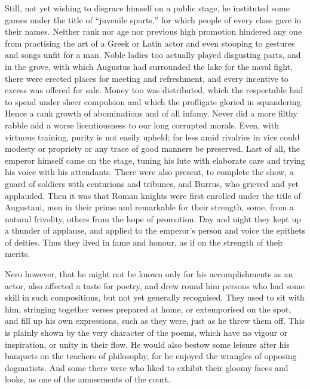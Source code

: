 Still, not yet wishing to disgrace himself on a public stage, he instituted some games under the title of ``juvenile sports,'' for which people of every class gave in their names. Neither rank nor age nor previous high promotion hindered any one from practising the art of a Greek or Latin actor and even stooping to gestures and songs unfit for a man. Noble ladies too actually played disgusting parts, and in the grove, with which Augustus had surrounded the lake for the naval fight, there were erected places for meeting and refreshment, and every incentive to excess was offered for sale. Money too was distributed, which the respectable had to spend under sheer compulsion and which the profligate gloried in squandering. Hence a rank growth of abominations and of all infamy. Never did a more filthy rabble add a worse licentiousness to our long corrupted morals. Even, with virtuous training, purity is not easily upheld; far less amid rivalries in vice could modesty or propriety or any trace of good manners be preserved. Last of all, the emperor himself came on the stage, tuning his lute with elaborate care and trying his voice with his attendants. There were also present, to complete the show, a guard of soldiers with centurions and tribunes, and Burrus, who grieved and yet applauded. Then it was that Roman knights were first enrolled under the title of Augustani, men in their prime and remarkable for their strength, some, from a natural frivolity, others from the hope of promotion. Day and night they kept up a thunder of applause, and applied to the emperor's person and voice the epithets of deities. Thus they lived in fame and honour, as if on the strength of their merits.


Nero however, that he might not be known only for his accomplishments as an actor, also affected a taste for poetry, and drew round him persons who had some skill in such compositions, but not yet generally recognised. They used to sit with him, stringing together verses prepared at home, or extemporised on the spot, and fill up his own expressions, such as they were, just as he threw them off. This is plainly shown by the very character of the poems, which have no vigour or inspiration, or unity in their flow. He would also bestow some leisure after his banquets on the teachers of philosophy, for he enjoyed the wrangles of opposing dogmatists. And some there were who liked to exhibit their gloomy faces and looks, as one of the amusements of the court.


